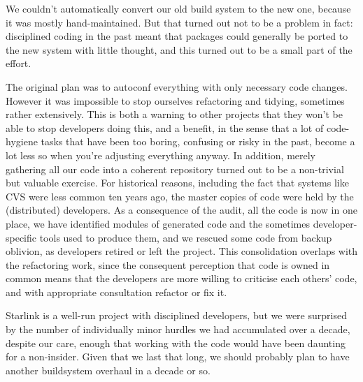 \documentclass{speauth}
\begin{document}
We couldn't automatically convert our old build system to the new one,
because it was mostly hand-maintained.  But that turned out not to be
a problem in fact: disciplined coding in the past meant that packages
could generally be ported to the new system with little thought, and
this turned out to be a small part of the effort.

The original plan was to autoconf everything with only necessary code
changes.  However it was impossible to stop ourselves refactoring and
tidying, sometimes rather extensively.  This is both a warning to
other projects that they won't be able to stop developers doing this,
and a benefit, in the sense that a lot of code-hygiene tasks that have
been too boring, confusing or risky in the past, become a lot less so
when you're adjusting everything anyway.  In addition, merely
gathering all our code into a coherent repository turned out to be a
non-trivial but valuable exercise.  For historical reasons, including
the fact that systems like CVS were less common ten years ago, the
master copies of code were held by the (distributed) developers.  As a
consequence of the audit, all the code is now in one place, we have
identified modules of generated code and the sometimes
developer-specific tools used to produce them, and we rescued some
code from backup oblivion, as developers retired or left the project.
This consolidation overlaps with the refactoring work, since the
consequent perception that code is owned in common means that the
developers are more willing to criticise each others' code, and with
appropriate consultation refactor or fix it.

Starlink is a well-run project with disciplined developers, but we
were surprised by the number of individually minor hurdles we had
accumulated over a decade, despite our care, enough that working with
the code would have been daunting for a non-insider.  Given that we
last that long, we should probably plan to have another buildsystem
overhaul in a decade or so.
\end{document}
